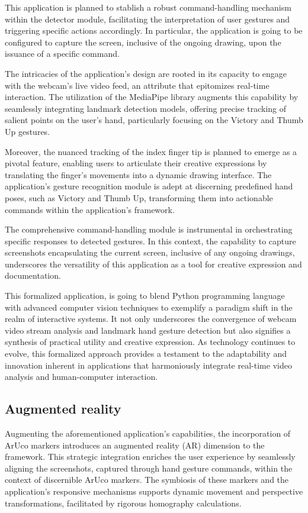 \documentclass[journal]{IEEEtran}
\begin{document}
This application is planned to stablish a robust command-handling mechanism within the detector module, facilitating the interpretation of user 
gestures and triggering specific actions accordingly. In particular, the application is going to be configured to capture the screen, inclusive 
of the ongoing drawing, upon the issuance of a specific command.

The intricacies of the application's design are rooted in its capacity to engage with the webcam's live video feed, an attribute that 
epitomizes real-time interaction. The utilization of the MediaPipe library augments this capability by seamlessly integrating landmark 
detection models, offering precise tracking of salient points on the user's hand, particularly focusing on the Victory and Thumb Up gestures.

Moreover, the nuanced tracking of the index finger tip is planned to emerge as a pivotal feature, enabling users to articulate their creative 
expressions by translating the finger's movements into a dynamic drawing interface. The application’s gesture recognition module is 
adept at discerning predefined hand poses, such as Victory and Thumb Up, transforming them into actionable commands within the 
application's framework.

The comprehensive command-handling module is instrumental in orchestrating specific responses to detected gestures. In this context, 
the capability to capture screenshots encapsulating the current screen, inclusive of any ongoing drawings, underscores the versatility 
of this application as a tool for creative expression and documentation.

This formalized application, is going to blend Python programming language with advanced computer vision techniques to exemplify a paradigm 
shift in the realm of interactive systems. It not only underscores the convergence of webcam video stream analysis and landmark hand 
gesture detection but also signifies a synthesis of practical utility and creative expression. As technology continues to evolve, 
this formalized approach provides a testament to the adaptability and innovation inherent in applications that harmoniously integrate 
real-time video analysis and human-computer interaction.

\subsection*{Augmented reality}
Augmenting the aforementioned application's capabilities, the incorporation of ArUco markers introduces an augmented reality (AR) 
dimension to the framework. This strategic integration enriches the user experience by seamlessly aligning the screenshots, captured 
through hand gesture commands, within the context of discernible ArUco markers. The symbiosis of these markers and the application's 
responsive mechanisms supports dynamic movement and perspective transformations, facilitated by rigorous homography calculations.
\end{document}

